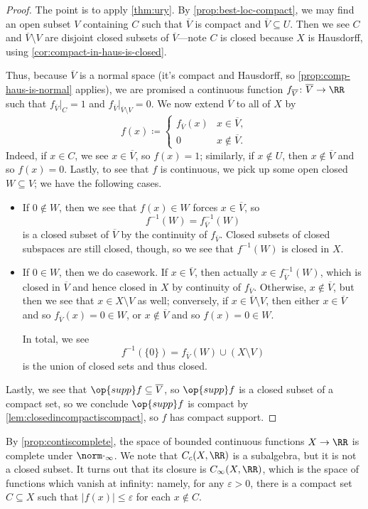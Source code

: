 \documentclass[../notes.tex]{subfiles}
\begin{document}
\begin{proof}
	The point is to apply \autoref{thm:ury}. By \autoref{prop:best-loc-compact}, we may find an open subset $V$ containing $C$ such that $\overline V$ is compact and $\overline V\subseteq U$. Then we see $C$ and $\overline V\setminus V$ are disjoint closed subsets of $\overline V$---note $C$ is closed because $X$ is Hausdorff, using \autoref{cor:compact-in-haus-is-closed}.
	
	Thus, because $\overline V$ is a normal space (it's compact and Hausdorff, so \autoref{prop:comp-haus-is-normal} applies), we are promised a continuous function $f_{\overline V}\colon\overline V\to\RR$ such that $f_{\overline V}|_C=1$ and $f_{\overline V}|_{\overline V\setminus V}=0$. We now extend $\overline V$ to all of $X$ by
	\[f(x)\coloneqq\begin{cases}
		f_{\overline V}(x) & x\in\overline V, \\
		0 & x\notin\overline V.
	\end{cases}\]
	Indeed, if $x\in C$, we see $x\in\overline V$, so $f(x)=1$; similarly, if $x\notin U$, then $x\notin\overline V$ and so $f(x)=0$. Lastly, to see that $f$ is continuous, we pick up some open closed $W\subseteq V$; we have the following cases.
	\begin{itemize}
		\item If $0\notin W$, then we see that $f(x)\in W$ forces $x\in\overline V$, so
		\[f^{-1}(W)=f^{-1}_{\overline V}(W)\]
		is a closed subset of $\overline V$ by the continuity of $f_{\overline V}$. Closed subsets of closed subspaces are still closed, though, so we see that $f^{-1}(W)$ is closed in $X$.
		\item If $0\in W$, then we do casework. If $x\in\overline V$, then actually $x\in f_{\overline V}^{-1}(W)$, which is closed in $\overline V$ and hence closed in $X$ by continuity of $f_{\overline V}$. Otherwise, $x\notin\overline V$, but then we see that $x\in X\setminus V$ as well; conversely, if $x\in\overline V\setminus V$, then either $x\in\overline V$ and so $f_{\overline V}(x)=0\in W$, or $x\notin\overline V$ and so $f(x)=0\in W$.

		In total, we see
		\[f^{-1}(\{0\})=f_{\overline V}(W)\cup(X\setminus V)\]
		is the union of closed sets and thus closed.
	\end{itemize}
	Lastly, we see that $\op{supp}f\subseteq\overline V$, so $\op{supp}f$ is a closed subset of a compact set, so we conclude $\op{supp}f$ is compact by \autoref{lem:closedincompactiscompact}, so $f$ has compact support.
\end{proof}
\begin{remark}
	By \autoref{prop:contiscomplete}, the space of bounded continuous functions $X\to\RR$ is complete under $\norm\cdot_\infty$. We note that $C_c(X,\RR)$ is a subalgebra, but it is not a closed subset. It turns out that its closure is $C_\infty(X,\RR)$, which is the space of functions which vanish at infinity: namely, for any $\varepsilon>0$, there is a compact set $C\subseteq X$ such that $|f(x)|\le\varepsilon$ for each $x\notin C$.
\end{remark}
\end{document}
